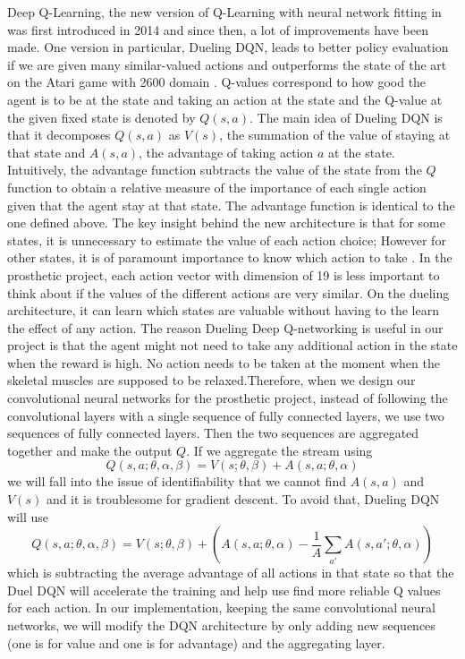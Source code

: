 \documentclass[journal,onecolumn]{IEEEtran}
\begin{document}
Deep Q-Learning, the new version of Q-Learning with neural network fitting in was first introduced in 2014 and since then, a lot of improvements have been made. One version in particular, Dueling DQN, leads to better policy evaluation if we are given many similar-valued actions and outperforms the state of the art on the Atari game with 2600 domain . Q-values correspond to how good the agent is to be at the state and taking an action at the state and the Q-value at the given fixed state is denoted by $Q(s,a)$. The main idea of Dueling DQN is that it decomposes $Q(s,a)$ as $V(s)$, the summation of the value of staying at that state and $A(s,a)$, the advantage of taking action $a$ at the state. Intuitively, the advantage function subtracts the value of the state from the $Q$ function to obtain a relative measure of the importance of each single action given that the agent stay at that state. The advantage function is identical to the one defined above. The key insight behind the new architecture is that for some states, it is unnecessary to estimate the value of each action choice; However for other states, it is of paramount importance to know which action to take . In the prosthetic project, each action vector with dimension of 19 is less important to think about if the values of the different actions are very similar. On the dueling architecture, it can learn which states are valuable without having to the learn the effect of any action. The reason Dueling Deep Q-networking is useful in our project is that the agent might not need to take any additional action in the state when the reward is high. No action needs to be taken at the moment when the skeletal muscles are supposed to be relaxed.Therefore, when we design our convolutional neural networks for the prosthetic project, instead of following the convolutional layers with a single sequence of fully connected  layers, we use two sequences of fully connected layers. Then the two sequences are aggregated together and make the output $Q$. If we aggregate the stream using $$ Q(s,a;\theta,\alpha,\beta) = V(s;\theta,\beta) + A(s,a;\theta,\alpha) $$ we will fall into the issue of identifiability that we cannot find $A(s,a)$ and $V(s)$ and it is troublesome for gradient descent. To avoid that, Dueling DQN will use $$Q(s,a;\theta,\alpha,\beta) = V(s;\theta,\beta) + (A(s,a;\theta,\alpha) - \frac{1}{A}\sum_{a'}{A(s,a';\theta,\alpha)})$$ which is subtracting the average advantage of all actions in that state so that the Duel DQN will accelerate the training and help use find more reliable Q values for each action. In our implementation, keeping the same convolutional neural networks, we will modify the DQN architecture by only adding new sequences (one is for value and one is for advantage) and the aggregating layer.
\end{document}

